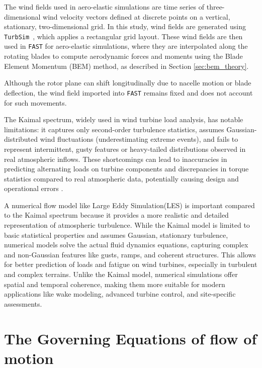 The wind fields used in aero-elastic simulations are time series of three-dimensional wind velocity vectors defined at discrete points on a vertical, stationary, two-dimensional grid. In this study, wind fields are generated using \texttt{TurbSim}~\cite{ref57}, which applies a rectangular grid layout. These wind fields are then used in \texttt{FAST} for aero-elastic simulations, where they are interpolated along the rotating blades to compute aerodynamic forces and moments using the Blade Element Momentum (BEM) method, as described in Section \ref{sec:bem_theory}. 

Although the rotor plane can shift longitudinally due to nacelle motion or blade deflection, the wind field imported into \texttt{FAST} remains fixed and does not account for such movements.


The Kaimal spectrum, widely used in wind turbine load analysis, has notable limitations: it captures only second-order turbulence statistics, assumes Gaussian-distributed wind fluctuations (underestimating extreme events), and fails to represent intermittent, gusty features or heavy-tailed distributions observed in real atmospheric inflows. These shortcomings can lead to inaccuracies in predicting alternating loads on turbine components and discrepancies in torque statistics compared to real atmospheric data, potentially causing design and operational errors \cite{Mucke2011}.

A numerical flow model like Large Eddy Simulation(LES) is important compared to the Kaimal spectrum because it provides a more realistic and detailed representation of atmospheric turbulence. While the Kaimal model is limited to basic statistical properties and assumes Gaussian, stationary turbulence, numerical models solve the actual fluid dynamics equations, capturing complex and non-Gaussian features like gusts, ramps, and coherent structures. This allows for better prediction of loads and fatigue on wind turbines, especially in turbulent and complex terrains. Unlike the Kaimal model, numerical simulations offer spatial and temporal coherence, making them more suitable for modern applications like wake modeling, advanced turbine control, and site-specific assessments. \cite{Doubrawa2019}


\section{The Governing Equations of flow of motion}
